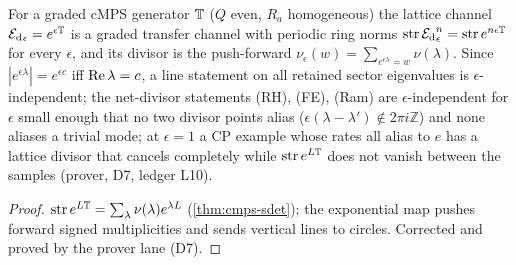 \begin{proposition}
\label{prop:graded-continuum-exact}
For a graded cMPS generator $\mathbb T$ ($Q$ even, $R_a$ homogeneous) the lattice channel ${\mathcal E_{\mathrm d}}_\epsilon
= e^{\epsilon\mathbb T}$ is a graded transfer channel with periodic ring norms $\operatorname{str}{\mathcal E_{\mathrm d}}_\epsilon^n =
\operatorname{str} e^{n\epsilon\mathbb T}$ for every $\epsilon$, and its divisor is the push-forward
$\nu_\epsilon(w) = \sum_{e^{\epsilon\lambda} = w}\nu(\lambda)$. Since $|e^{\epsilon\lambda}| =
e^{\epsilon c}$ iff $\operatorname{Re}\lambda = c$, a line statement on all retained sector eigenvalues is
$\epsilon$-independent; the net-divisor statements (RH), (FE), (Ram) are $\epsilon$-independent for
$\epsilon$ small enough that no two divisor points alias ($\epsilon(\lambda-\lambda')\notin2\pi i
\mathbb Z$) and none aliases a trivial mode; at $\epsilon = 1$ a CP example whose rates all alias to
$e$ has a lattice divisor that cancels completely while $\operatorname{str} e^{L\mathbb T}$ does not vanish between the
samples (prover, D7, ledger L10).
\end{proposition}
\begin{proof}
$\operatorname{str} e^{L\mathbb T} = \sum_\lambda\nu(\lambda)e^{\lambda L}$ (\cref{thm:cmps-sdet}); the exponential map
pushes forward signed multiplicities and sends vertical lines to circles. Corrected and proved by
the prover lane (D7).
\end{proof}

